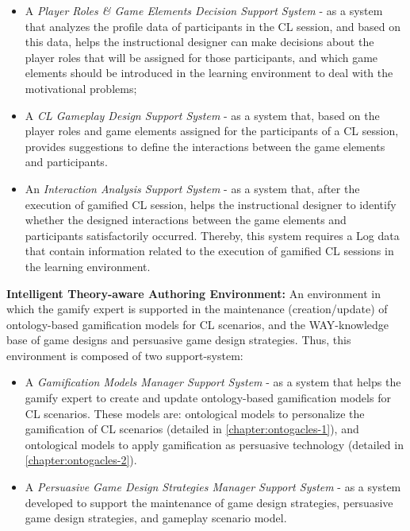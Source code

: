 \begin{itemize}
\item A \emph{Player Roles \& Game Elements Decision Support System} - as a system that analyzes the profile data of participants in the CL session, and based on this data, helps the instructional designer can make decisions about the player roles that will be assigned for those participants, and which game elements should be introduced in the learning environment to deal with the motivational problems;

\item A \emph{CL Gameplay Design Support System} - as a system that, based on the player roles and game elements assigned for the participants of a CL session, provides suggestions to define the interactions between the game elements and participants.

\item An \emph{Interaction Analysis Support System} - as a system that, after the execution of gamified CL session, helps the instructional designer to identify whether the designed interactions between the game elements and participants satisfactorily occurred.
Thereby, this system requires a Log data that contain information related to the execution of gamified CL sessions in the learning environment.
\end{itemize}


\noindent \textbf{Intelligent Theory-aware Authoring Environment:} An environment in which the gamify expert is supported in the maintenance (creation/update) of ontology-based gamification models for CL scenarios, and the WAY-knowledge base of game designs and persuasive game design strategies.
Thus, this environment is composed of two support-system:

\begin{itemize}
\item A \emph{Gamification Models Manager Support System} - as a system that helps the gamify expert to create and update ontology-based gamification models for CL scenarios.
These models are: ontological models to personalize the gamification of CL scenarios (detailed in \autoref{chapter:ontogacles-1}), and ontological models to apply gamification as persuasive technology (detailed in \autoref{chapter:ontogacles-2}).


\item A \emph{Persuasive Game Design Strategies Manager Support System} - as a system developed to support the maintenance of game design strategies, persuasive game design strategies, and gameplay scenario model.
\end{itemize}

